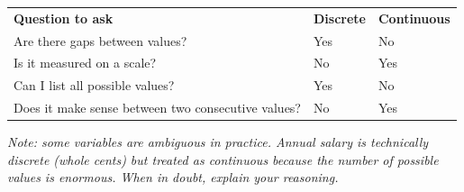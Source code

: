 \documentclass[aspectratio=169, 11pt]{beamer}
\begin{document}
{
\begin{frame}[t, plain]
  \hspace{0.4cm}%
  \begin{minipage}{0.93\textwidth}
    \vspace{0.55cm}
    \small
    \setlength{\tabcolsep}{10pt}
    \renewcommand{\arraystretch}{1.8}
    \begin{tabular}{@{} p{}
                        >{\centering\arraybackslash}p{}
                        >{\centering\arraybackslash}p{} @{}}
      \rowcolor{navy}
      {\color{white}\bfseries Question to ask} &
      {\color{white}\bfseries Discrete} &
      {\color{white}\bfseries Continuous} \\
      Are there gaps between values?  & Yes & No \\
      \rowcolor{sky}
      Is it measured on a scale?      & No  & Yes \\
      Can I list all possible values? & Yes & No \\
      \rowcolor{sky}
      Does it make sense between two consecutive values? & No & Yes \\
    \end{tabular}

    \vspace{0.6cm}
    \footnotesize\color{slate}
    \textit{Note: some variables are ambiguous in practice.
    Annual salary is technically discrete (whole cents) but treated
    as continuous because the number of possible values is enormous.
    When in doubt, explain your reasoning.}
  \end{minipage}
\end{frame}
}
\end{document}
